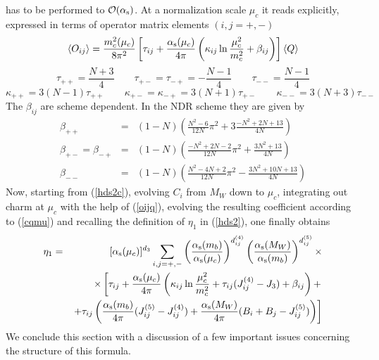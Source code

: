 has to be performed to ${\cal O}(\alpha_{\rm s})$. At a normalization
scale $\mu_c$ it reads explicitly, expressed in terms of operator
matrix elements $(i, j=+, -)$
\begin{equation}\label{oijq}
\langle O_{ij}\rangle=\frac{m^2_c(\mu_c)}{8\pi^2}\left[ \tau_{ij}+
 \frac{\alpha_{\rm s}(\mu_c)}{4\pi}\left( \kappa_{ij}
 \ln\frac{\mu^2_c}{m^2_c}+\beta_{ij}\right)\right]
 \langle Q\rangle
\end{equation}
\begin{equation}\label{tauij}
\tau_{++}=\frac{N+3}{4}
\qquad
\tau_{+-}=\tau_{-+}=-\frac{N-1}{4}
\qquad
\tau_{--}=\frac{N-1}{4}
\end{equation}
\begin{equation}\label{kapij}
\kappa_{++}=3(N-1)\tau_{++}
\qquad
\kappa_{+-}=\kappa_{-+}=3(N+1)\tau_{+-}
\qquad
\kappa_{--}=3(N+3)\tau_{--}
\end{equation}
The $\beta_{ij}$ are scheme dependent. In the NDR scheme they are
given by \cite{herrlichnierste:93}
\begin{eqnarray}\label{betij}
\beta_{++} &=& (1-N)\left(\frac{N^2-6}{12N}\pi^2+
 3\frac{-N^2+2N+13}{4N} \right)  \nonumber \\
\beta_{+-}=\beta_{-+} &=& (1-N)\left(\frac{-N^2+2N-2}{12N}\pi^2+
 \frac{3N^2+13}{4N} \right)    \\
\beta_{--} &=& (1-N)\left(\frac{N^2-4N+2}{12N}\pi^2-
 \frac{3N^2+10N+13}{4N} \right)  \nonumber
\end{eqnarray}
Now, starting from (\ref{hds2c}), evolving $C_i$ from $M_W$ down to
$\mu_c$, integrating out charm at $\mu_c$ with the help of
(\ref{oijq}), evolving the resulting coefficient according to
(\ref{cqmu}) and recalling the definition of $\eta_1$ in
(\ref{hds2}), one finally obtains
\begin{eqnarray}\label{eta1}
\eta_1=&&[\alpha_{\rm s}(\mu_c)]^{d_3}\sum_{i,j=+,-}
\left(\frac{\alpha_{\rm s}(m_b)}{\alpha_{\rm s}(\mu_c)}\right)^{d^{(4)}_{ij}}
\left(\frac{\alpha_{\rm s}(M_W)}{\alpha_{\rm s}(m_b)}\right)^{d^{(5 )}_{ij}}\times
\nonumber \\
&&\times\left[\tau_{ij}+\frac{\alpha_{\rm s}(\mu_c)}{4\pi}\left(\kappa_{ij}
\ln\frac{\mu^2_c}{m^2_c}+\tau_{ij}(J^{(4)}_{ij}-J_3)+\beta_{ij}
\right)+\right. \nonumber \\
&&\left. +\tau_{ij}\left(\frac{\alpha_{\rm s}(m_b)}{4\pi}
(J^{(5)}_{ij}-J^{(4)}_{ij})+\frac{\alpha_{\rm s}(M_W)}{4\pi}
(B_i+B_j-J^{(5)}_{ij})\right)\right]
\end{eqnarray}
We conclude this section with a discussion of a few important
issues concerning the structure of this formula.
